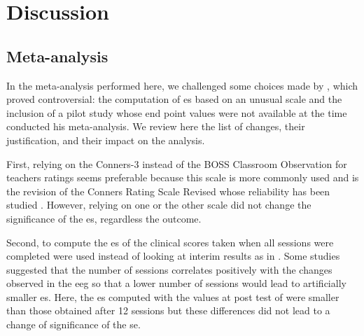


\section{Discussion}

\subsection{Meta-analysis} 

In the meta-analysis performed here, we challenged some choices made by \citeauthor{Cortese2016}, which proved controversial: 
the computation of \gls{es} based on an unusual scale \citep{Steiner2014} and the inclusion of a pilot study \citep{Arnold2014} 
whose end point values were not available at the time \citeauthor{Cortese2016} conducted his meta-analysis. We review here the 
list of changes, their justification, and their impact on the analysis.
 
First, relying on the Conners-3 \citep{Conners2011} instead of the BOSS Classroom Observation \citep{Shapiro2010} for
teachers ratings seems preferable because this scale is more commonly used \citep{Christiansen2014, Bluschke2016} and is
the revision of the Conners Rating Scale Revised \citep{Conners1998} whose reliability has been studied \citep{Collett2003}. 
However, relying on one or the other scale did not change the significance of the \gls{es}, regardless the outcome.

Second, to compute the \gls{es} of \citet{Arnold2014} the clinical scores taken when all sessions were completed were 
used instead of looking at interim results as in \citeauthor{Cortese2016}. Some studies suggested that the number of sessions 
correlates positively with the changes observed in the \gls{eeg} \citep{Vernon2004} so that a lower number of sessions would 
lead to artificially smaller \gls{es}. Here, the \gls{es} computed with the values at post test of \citet{Arnold2014} were smaller 
than those obtained after 12 sessions but these differences did not lead to a change of significance of the \gls{se}. 

